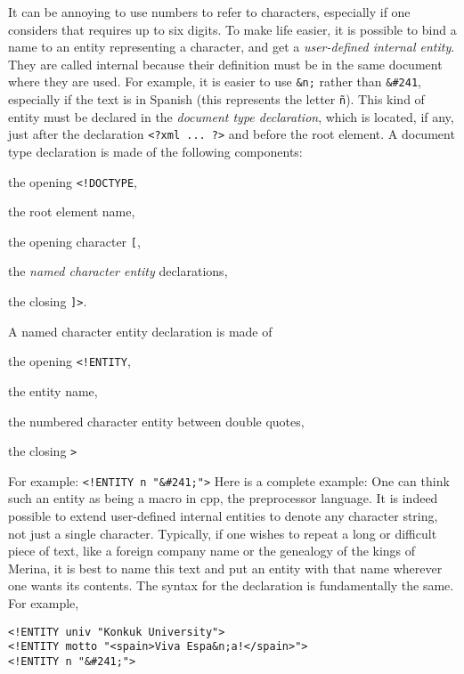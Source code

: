 It can be annoying to use numbers to refer to characters, especially
if one considers that \Unicode requires up to six digits. To make life
easier, it is possible to bind a name to an entity representing a
character, and get a \emph{user\hyp{}defined internal entity}. They
are called internal because their definition must be in the same
document where they are used. For example, it is easier to use
\verb|&n;| rather than \verb|&#241|, especially if the text is in
Spanish (this represents the letter \texttt{\~{n}}). This kind of
entity must be declared in the \emph{document type declaration}, which
is located, if any, just after the declaration \verb|<?xml ... ?>| and
before the root element.
\label{xml_intro:DOCTYPE} A document type declaration is made of the
following components:
\begin{enumerate*}

  \item the opening \verb|<!DOCTYPE|,

  \item the root element name,

  \item the opening character \verb|[|,
  
  \item the \emph{named character entity} declarations,

  \item the closing \verb|]>|.

\end{enumerate*}
A named character entity declaration is made of
\begin{enumerate*}

  \item the opening \verb|<!ENTITY|,

  \item the entity name,

  \item the numbered character entity between double quotes,

  \item the closing \verb|>|

\end{enumerate*}
For example: \verb|<!ENTITY n "&#241;">|
Here is a complete example:
\noindent One can think such an entity as being a macro in
\textsf{cpp}, the \Clang preprocessor language. It is indeed possible
to extend user\hyp{}defined internal entities to denote any character
string, not just a single character. Typically, if one wishes to
repeat a long or difficult piece of text, like a foreign company name
or the genealogy of the kings of Merina, it is best to name this text
and put an entity with that name wherever one wants its contents. The
syntax for the declaration is fundamentally the same. For example,
\begin{verbatim}
<!ENTITY univ "Konkuk University">
<!ENTITY motto "<spain>Viva Espa&n;a!</spain>">
<!ENTITY n "&#241;">
\end{verbatim}

